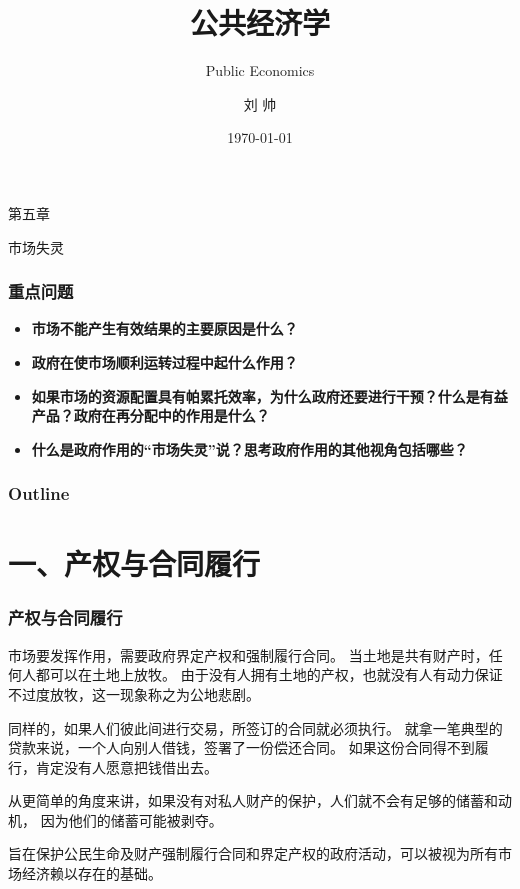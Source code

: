 \documentclass[aspectratio=169, 12pt]{beamer}
\title{公共经济学}
\subtitle{Public Economics}
\author[LIU ShHUAI]{刘 {  } 帅}
\institute{山西师范大学 {  } 经济与管理学院}
\date{\today}
\begin{document}
\maketitle

\begin{frame}[standout]
    第五章\par
    \addtolength{\parskip}{.4em}
    市场失灵
\end{frame}

\begin{frame}[plain]
    \frametitle{重点问题}
    \begin{itemize}
        \item \textbf{市场不能产生有效结果的主要原因是什么？}
        \item \textbf{政府在使市场顺利运转过程中起什么作用？}
        \item \textbf{如果市场的资源配置具有帕累托效率，为什么政府还要进行干预？什么是有益产品？政府在再分配中的作用是什么？}
        \item \textbf{什么是政府作用的“市场失灵”说？思考政府作用的其他视角包括哪些？}
    \end{itemize}
\end{frame}

\begin{frame}[plain]
    \frametitle{Outline}
    \tableofcontents[hideallsubsections]
\end{frame}

\section{一、产权与合同履行}

\begin{frame}[plain]
    \frametitle{产权与合同履行}
    市场要发挥作用，需要政府界定产权和强制履行合同。
    当土地是共有财产时，任何人都可以在土地上放牧。
    由于没有人拥有土地的产权，也就没有人有动力保证不过度放牧，这一现象称之为公地悲剧。
    \par
    同样的，如果人们彼此间进行交易，所签订的合同就必须执行。
    就拿一笔典型的贷款来说，一个人向别人借钱，签署了一份偿还合同。
    如果这份合同得不到履行，肯定没有人愿意把钱借出去。
    \par
    从更简单的角度来讲，如果没有对私人财产的保护，人们就不会有足够的储蓄和动机，
    因为他们的储蓄可能被剥夺。
    \par
    旨在保护公民生命及财产强制履行合同和界定产权的政府活动，可以被视为所有市场经济赖以存在的基础。
\end{frame}
\end{document}
